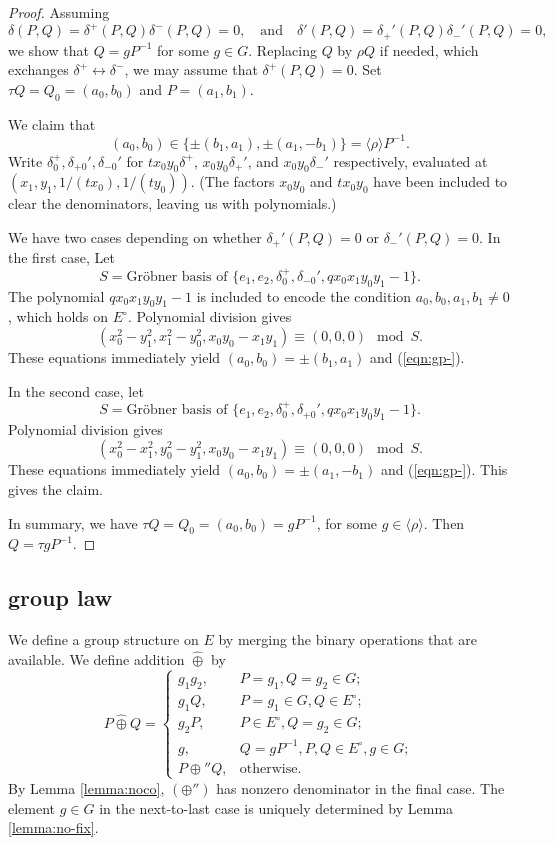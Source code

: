 \documentclass[12pt]{article}
\newcommand{\Eoo}{E^{\circ}}
\newcommand{\hplus}{\hat\oplus}
\newcommand{\Go}{\langle\rho\rangle}
\def\cong{\equiv}
\begin{document}
\begin{proof} 
  Assuming
  \[
  \delta(P,Q) = \delta^+(P,Q)\delta^-(P,Q)=0,\quad\text{and}\quad
  \delta'(P,Q) = \delta_+'(P,Q)\delta_-'(P,Q)=0,
  \]
  we show that $Q = g P^{-1}$ for some $g\in G$.
  Replacing $Q$ by $\rho Q$ if needed, which exchanges
  $\delta^+\leftrightarrow \delta^-$, we may assume that
  $\delta^+(P,Q)=0$.  Set $\tau Q = Q_0 = (a_0,b_0)$ and
  $P=(a_1,b_1)$.  

We claim that
\begin{equation}\label{eqn:gp-}
(a_0,b_0) \in \{\pm (b_1,a_1),\pm (a_1,-b_1)\} = \Go P^{-1}.
\end{equation}
Write $\delta^+_0,\delta_{+0}',\delta_{-0}'$ for $t x_0 y_0\delta^+$,
$x_0 y_0\delta_+'$, and $x_0 y_0 \delta_-'$ respectively, evaluated at
$(x_1,y_1,1/(t x_0),1/(t y_0))$. (The factors $x_0y_0$ and $t x_0 y_0$ 
have been included to clear the
denominators, leaving us with polynomials.)

We have two cases depending on whether $\delta_+'(P,Q)=0$ or
$\delta_-'(P,Q)=0$.  In the first case, Let
\[
S = \text{Gr\"obner basis of } \{e_1,e_2, 
\delta^+_0,\delta_{-0}',q x_0 x_1 y_0 y_1 - 1\}.
\]
The polynomial $q x_0 x_1 y_0 y_1-1$ is included to encode the
condition $a_0,b_0,a_1,b_1\ne 0$, which holds on $\Eoo$.
Polynomial division gives
\[
(x_0^2-y_1^2,x_1^2-y_0^2,x_0 y_0 - x_1 y_1) \cong (0,0,0) \mod S.
\]
These equations immediately yield $(a_0,b_0) = \pm (b_1,a_1)$ and
(\ref{eqn:gp-}).  

In the second case, let
\[
S = \text{Gr\"obner basis of } \{e_1,e_2, 
\delta^+_0,\delta_{+0}',q x_0 x_1 y_0 y_1 - 1\}.
\]
Polynomial division gives
\[
(x_0^2-x_1^2,y_0^2-y_1^2,x_0 y_0 - x_1 y_1) \cong (0,0,0) \mod S.
\]
These equations immediately yield $(a_0,b_0) = \pm (a_1,-b_1)$ and
(\ref{eqn:gp-}).  This gives the claim.

In summary, we have $\tau Q = Q_0 = (a_0,b_0) = g P^{-1}$, for some
$g\in \Go$.  Then $Q = \tau g P^{-1}$.
\end{proof}

\subsection{group law}

We define a group structure on $E$ by merging the binary operations
that are available.  We define addition $\hplus$ by
\begin{equation}
P\hplus Q = \begin{cases}
g_1 g_2,& P = g_1, Q = g_2 \in G;\\
g_1 Q,& P = g_1\in G,  Q\in \Eoo;\\
g_2 P,& P \in \Eoo, Q = g_2\in G;\\
g,& Q = g P^{-1}, P,Q\in \Eoo, g\in G;\\
P\oplus'' Q,&\text{otherwise}.
\end{cases}
\end{equation}
By Lemma \ref{lemma:noco}, $(\oplus'')$ has nonzero denominator
in the final case.   The
element $g\in G$ in the next-to-last case is uniquely determined by Lemma
\ref{lemma:no-fix}.
\end{document}
